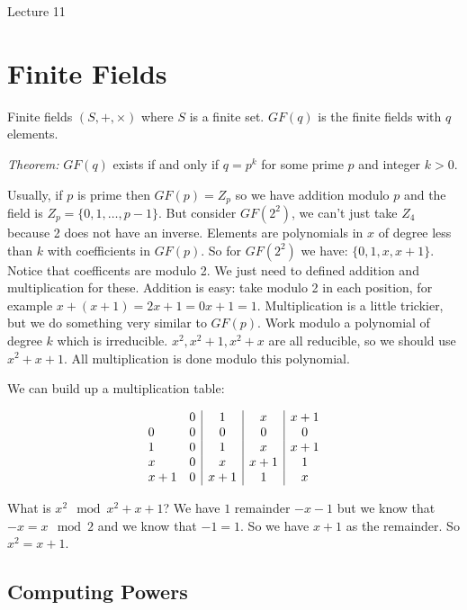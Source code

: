 \documentclass[psamsfonts]{amsart}
\begin{document}
\newpage
\Large{Lecture 11}


\maketitle

\section{Finite Fields}

Finite fields $(S, +, \times)$ where $S$ is a finite set. $GF(q)$ is the finite fields with $q$ elements.

\emph{Theorem:} $GF(q)$ exists if and only if $q = p^k$ for some prime $p$ and integer $k > 0$.

Usually, if $p$ is prime then $GF(p) = Z_p$ so we have addition modulo $p$ and the field is $Z_{p} = \{0, 1, \ldots, p-1\}$. But consider $GF(2^2)$, we can't just take $Z_{4}$ because 2 does not have an inverse. Elements are polynomials in $x$ of degree less than $k$ with coefficients in $GF(p)$. So for $GF(2^2)$ we have: $\{0, 1, x, x+1 \}$. Notice that coefficents are modulo 2. We just need to defined addition and multiplication for these. Addition is easy: take modulo 2 in each position, for example $x + (x+1) = 2x + 1 = 0x + 1 = 1$. Multiplication is a little trickier, but we do something very similar to $GF(p)$. Work modulo a polynomial of degree $k$ which is irreducible. $x^2, x^2 + 1, x^2 + x$ are all reducible, so we should use $x^2 + x + 1$. All multiplication is done modulo this polynomial.

We can build up a multiplication table:

\begin{eqnarray}
  \begin{array}{l c | c | c | c}
    & 0 & 1 & x & x+1 \\
  0 & 0 & 0 & 0 & 0 \\
  1 & 0 & 1 & x & x + 1 \\
  x & 0 & x & x+1 & 1 \\
x+1 & 0 & x +1 & 1 & x
  \end{array}
\end{eqnarray}

What is $x^2 \mod {x^2 + x + 1}$? We have $1$ remainder $-x -1$ but we know that $-x = x \mod{2}$ and we know that $-1 = 1$. So we have $x+1$ as the remainder. So $x^2 = x+1$. 

\subsection{Computing Powers}
\end{document}
